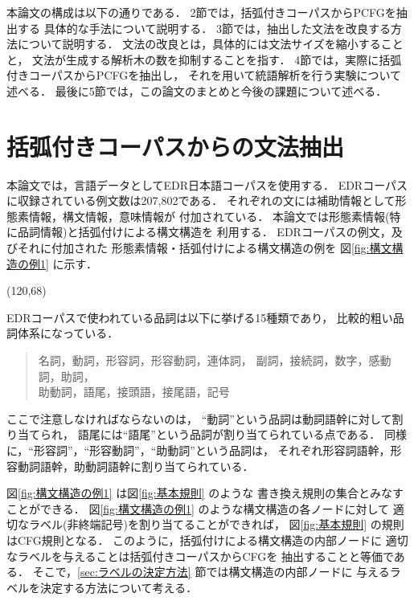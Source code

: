 本論文の構成は以下の通りである．
2節では，括弧付きコーパスからPCFGを抽出する
具体的な手法について説明する．
3節では，抽出した文法を改良する方法について説明する．
文法の改良とは，具体的には文法サイズを縮小することと，
文法が生成する解析木の数を抑制することを指す．
4節では，実際に括弧付きコーパスからPCFGを抽出し，
それを用いて統語解析を行う実験について述べる．
最後に5節では，この論文のまとめと今後の課題について述べる．
\section{括弧付きコーパスからの文法抽出}




本論文では，言語データとしてEDR日本語コーパスを使用する．
EDRコーパスに収録されている例文数は207,802である．
それぞれの文には補助情報として形態素情報，構文情報，意味情報が
付加されている．
本論文では形態素情報(特に品詞情報)と括弧付けによる構文構造を
利用する．
EDRコーパスの例文，及びそれに付加された
形態素情報・括弧付けによる構文構造の例を
図\ref{fig:構文構造の例1} に示す．

\begin{center}
  \atari(120,68)

\end{center}

EDRコーパスで使われている品詞は以下に挙げる15種類であり，
比較的粗い品詞体系になっている．
\begin{quote}
  名詞，動詞，形容詞，形容動詞，連体詞，
  副詞，接続詞，数字，感動詞，助詞，\\
  助動詞，語尾，接頭語，接尾語，記号
\end{quote}
ここで注意しなければならないのは，
``動詞''という品詞は動詞語幹に対して割り当てられ，
語尾には``語尾''という品詞が割り当てられている点である．
同様に，``形容詞''，``形容動詞''，``助動詞''という品詞は，
それぞれ形容詞語幹，形容動詞語幹，助動詞語幹に割り当てられている．



図\ref{fig:構文構造の例1} は図\ref{fig:基本規則} のような
書き換え規則の集合とみなすことができる．
図\ref{fig:構文構造の例1} のような構文構造の各ノードに対して
適切なラベル(非終端記号)を割り当てることができれば，
図\ref{fig:基本規則} の規則はCFG規則となる．
このように，括弧付けによる構文構造の内部ノードに
適切なラベルを与えることは括弧付きコーパスからCFGを
抽出することと等価である．
そこで，\ref{sec:ラベルの決定方法} 節では構文構造の内部ノードに
与えるラベルを決定する方法について考える．

